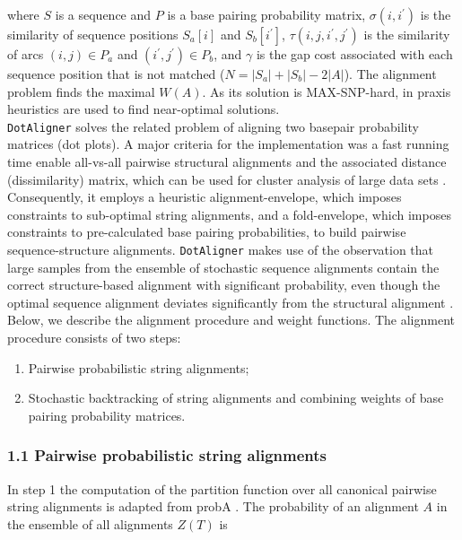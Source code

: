 \documentclass[a4paper,11pt]{article}
\newcommand\dotaligner{\texttt{DotAligner}}
\begin{document}
\noindent where $S$ is a sequence and $P$ is a base pairing probability matrix,
$\sigma(i,i^\prime)$ is the similarity of sequence positions $S_a[i]$ and
$S_b[i^\prime]$, $\tau(i,j,i^\prime,j^\prime)$ is the similarity of arcs $(i,j)
\in P_a$ and $(i^\prime,j^\prime) \in P_b$,
and $\gamma$ is the gap cost associated with each sequence position that is not
matched ($N = |S_a|+|S_b|-2|A|$). The alignment problem finds the maximal
$W(A)$. As its solution is MAX-SNP-hard, in praxis heuristics are used to find
near-optimal solutions.\\

\dotaligner{} solves the related problem of aligning two basepair
probability matrices (dot plots). A major criteria for the implementation was a fast
running time enable all-vs-all pairwise structural alignments and the 
associated distance (dissimilarity) matrix, which can be used for 
cluster analysis of large data sets \cite{Will17432929}. Consequently, 
it employs a heuristic alignment-envelope, 
which imposes constraints to sub-optimal string alignments, 
and a fold-envelope, which imposes constraints to pre-calculated base pairing probabilities, 
to build pairwise sequence-structure alignments. 
\dotaligner{} makes use of the observation that large samples from the ensemble 
of stochastic sequence alignments contain the correct structure-based alignment
with significant probability,  even though the optimal
sequence alignment deviates significantly from the structural alignment
\cite{muckstein2002stochastic}. \\

Below, we describe the alignment procedure and weight functions.
The alignment procedure consists of two steps:
\begin{enumerate}
  \item Pairwise probabilistic string alignments; 
  \item Stochastic backtracking of string alignments and combining
	  weights of base pairing probability matrices.
\end{enumerate}

\subsubsection*{1.1 Pairwise probabilistic string alignments}
In step 1 the computation of the partition function over all canonical pairwise
string alignments is adapted from probA \cite{muckstein2002stochastic}. The
probability of an alignment $A$ in the ensemble of all alignments $Z(T)$ is
\end{document}
